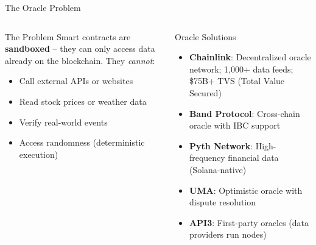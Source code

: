 \documentclass[8pt,aspectratio=169]{beamer}
\begin{document}
\begin{frame}{The Oracle Problem}
\begin{columns}[T]
\begin{block}{The Problem}
\footnotesize
Smart contracts are \textbf{sandboxed} -- they can only access data already on the blockchain. They \emph{cannot}:
\begin{itemize}
  \item Call external APIs or websites
  \item Read stock prices or weather data
  \item Verify real-world events
  \item Access randomness (deterministic execution)
\end{itemize}
\end{block}
\vspace{2mm}
\begin{block}{Oracle Solutions}
\footnotesize
\begin{itemize}
  \item \textbf{Chainlink}: Decentralized oracle network; 1,000+ data feeds; \$75B+ TVS (Total Value Secured)
  \item \textbf{Band Protocol}: Cross-chain oracle with IBC support
  \item \textbf{Pyth Network}: High-frequency financial data (Solana-native)
  \item \textbf{UMA}: Optimistic oracle with dispute resolution
  \item \textbf{API3}: First-party oracles (data providers run nodes)
\end{itemize}
\end{block}

\vspace{2mm}
\centering
{}
\end{columns}
\end{frame}
\end{document}
